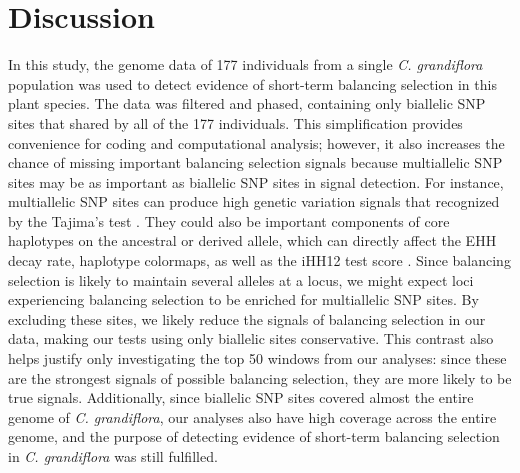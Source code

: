 \section{Discussion}
In this study, the genome data of 177 individuals from a single \emph{C. grandiflora} population was used to detect evidence of short-term balancing selection in this plant species. The data was filtered and phased, containing only biallelic SNP sites that shared by all of the 177 individuals. This simplification provides convenience for coding and computational analysis; however, it also increases the chance of missing important balancing selection signals because multiallelic SNP sites may be as important as biallelic SNP sites in signal detection. For instance, multiallelic SNP sites can produce high genetic variation signals that recognized by the Tajima’s test \citep{RN12}. They could also be important components of core haplotypes on the ancestral or derived allele, which can directly affect the EHH decay rate, haplotype colormaps, as well as the iHH12 test score \citep{RN15}. Since balancing selection is likely to maintain several alleles at a locus, we might expect loci experiencing balancing selection to be enriched for multiallelic SNP sites. By excluding these sites, we likely reduce the signals of balancing selection in our data, making our tests using only biallelic sites conservative. This contrast also helps justify only investigating the top 50 windows from our analyses: since these are the strongest signals of possible balancing selection, they are more likely to be true signals. Additionally, since biallelic SNP sites covered almost the entire genome of \emph{C. grandiflora}, our analyses also have high coverage across the entire genome, and the purpose of detecting evidence of short-term balancing selection in \emph{C. grandiflora} was still fulfilled.

